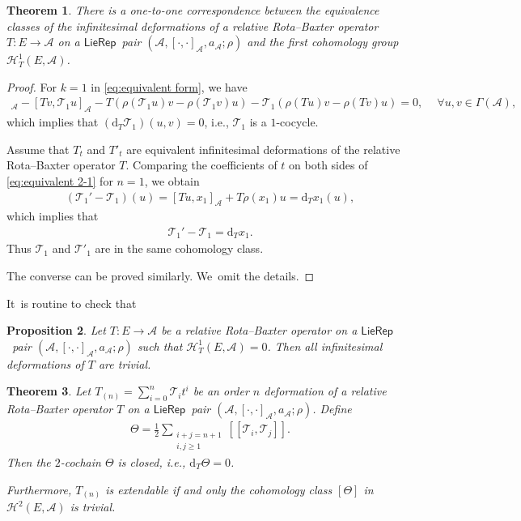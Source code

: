\documentclass[10pt,a4paper]{amsart}
\numberwithin{equation}{section}
\newtheorem{thm}{Theorem}[section]
\newtheorem{pro}[thm]{Proposition}
\newcommand{\huaA}{\mathcal{A}}
\newcommand{\huaT}{\mathcal{T}}
\newcommand{\huaH}{\mathcal{H}}
\newcommand{\Courant}[1]{\left[\!\left[ #1\right]\!\right]}
\newcommand{\half}{\frac{1}{2}}
\newcommand{\dM}{\mathrm{d}}
\newcommand{\LP}{$\mathsf{LieRep}$~}
\begin{document}
\begin{thm}\label{pro:equivalence class of O}
 There is a one-to-one correspondence between the equivalence classes of the infinitesimal deformations of a relative Rota--Baxter operator $T\colon E\longrightarrow \huaA$ on a \LP pair $(\huaA,[\cdot,\cdot]_\huaA,a_\huaA;\rho)$ and the first cohomology group $\huaH_{T}^1(E,\huaA)$.
\end{thm}
\begin{proof}
 For $k=1$ in \eqref{eq:equivalent form}, we have
 \begin{gather*}
 [Tu,\huaT_1 v]_\huaA\!-\![Tv,\huaT_1 u]_\huaA\!-\!T(\rho(\huaT_1 u)v\!-\!\rho(\huaT_1 v)u)\!-\!\huaT_1(\rho(T u)v\!-\!\rho(T v)u)\!=0,\quad\ \forall u,v\in\Gamma(\huaA),
 \end{gather*}
 which implies that $(\dM_T \huaT_1)(u,v)=0$, i.e., $\huaT_1$ is a $1$-cocycle.

 Assume that $T_t$ and $T'_t$ are equivalent infinitesimal deformations of the relative Rota--Baxter operator $T$. Comparing the coefficients of $t$ on both sides of \eqref{eq:equivalent 2-1} for $n=1$, we obtain
 \begin{eqnarray*}%
(\huaT_1'-\huaT_1)(u)=[Tu,x_1]_\huaA+T\rho(x_1)u=\dM_T x_1(u),
\end{eqnarray*}
which implies that
\begin{gather*}%
\huaT_1'-\huaT_1=\dM_T x_1.	
\end{gather*}
Thus $\huaT_1$ and $\huaT'_1$ are in the same cohomology class.

The converse can be proved similarly. We~omit the details.
\end{proof}


It~is routine to check that
{\sloppy\begin{pro}\label{pro:trivial of O-operator}
Let $T\colon E\longrightarrow \huaA$ be a relative Rota--Baxter operator on a \LP pair $(\huaA,[\cdot,\cdot]_\huaA,a_\huaA;\rho)$ such that $\huaH_{T}^1(E,\huaA)=0$. Then all infinitesimal deformations of $T$ are tri\-vial.
\end{pro}}




\begin{thm}\label{thm:extendable of O operrator}
 Let $T_{(n)}=\sum_{i=0}^{n}\huaT_it^i$ be an order $n$ deformation of a relative Rota--Baxter ope\-ra\-tor $T$ on a \LP pair $(\huaA,[\cdot,\cdot]_\huaA,a_\huaA;\rho)$. Define
 \begin{gather*}
 \Theta=\half\sum_{\substack{i+j=n+1\\ i,j\geq1}}\Courant{\huaT_i,\huaT_j}.
 \end{gather*}
 Then the $2$-cochain $\Theta$ is closed, i.e., $\dM_T \Theta=0$.

 Furthermore, $T_{(n)}$ is {extendable} if and only the cohomology class $[\Theta]$ in $\huaH^2(E,\huaA)$ is trivial.
\end{thm}
\end{document}
